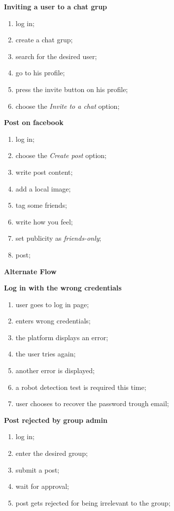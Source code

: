 \documentclass{article}
\begin{document}
				\textbf{Inviting a user to a chat grup}
				\begin{enumerate}
					\item log in;
					\item create a chat grup;
					\item search for the desired user;
					\item go to his profile;
					\item press the invite button on his profile;
					\item choose the \textit{Invite to a chat} option;
				\end{enumerate}

				\textbf{Post on facebook}
				\begin{enumerate}
					\item log in;
					\item choose the \textit{Create post} option;
					\item write post content;
					\item add a local image;
					\item tag some friends;
					\item write how you feel;
					\item set publicity as \textit{friends-only};
					\item post;
				\end{enumerate}

			\begin{center}
				\textbf{Alternate Flow}
			\end{center}

				\textbf{Log in with the wrong credentials}
				\begin{enumerate}
					\item user goes to log in page;
					\item enters wrong credentials;
					\item the platform displays an error;
					\item the user tries again;
					\item another error is displayed;
					\item a robot detection test is required this time;
					\item user chooses to recover the password trough email;
				\end{enumerate}

				\textbf{Post rejected by group admin}
				\begin{enumerate}
					\item log in;
					\item enter the desired group;
					\item submit a post;
					\item wait for approval;
					\item post gets rejected for being irrelevant to the group;
				\end{enumerate}
\end{document}

